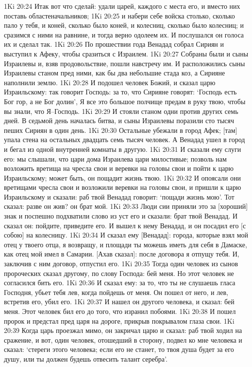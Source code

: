 1Ki 20:24  Итак вот что сделай: удали царей, каждого с места его, и вместо них поставь областеначальников;
1Ki 20:25  и набери себе войска столько, сколько пало у тебя, и коней, сколько было коней, и колесниц, сколько было колесниц; и сразимся с ними на равнине, и тогда верно одолеем их. И послушался он голоса их и сделал так.
1Ki 20:26  По прошествии года Венадад собрал Сириян и выступил к Афеку, чтобы сразиться с Израилем.
1Ki 20:27  Собраны были и сыны Израилевы и, взяв продовольствие, пошли навстречу им. И расположились сыны Израилевы станом пред ними, как бы два небольшие стада коз, а Сирияне наполнили землю.
1Ki 20:28  И подошел человек Божий, и сказал царю Израильскому: так говорит Господь: за то, что Сирияне говорят: `Господь есть Бог гор, а не Бог долин', Я все это большое полчище предам в руку твою, чтобы вы знали, что Я--Господь.
1Ki 20:29  И стояли станом одни против других семь дней. В седьмой день началась битва, и сыны Израилевы поразили сто тысяч пеших Сириян в один день.
1Ki 20:30  Остальные убежали в город Афек; [там] упала стена на остальных двадцать семь тысяч человек. А Венадад ушел в город и бегал из одной внутренней комнаты в другую.
1Ki 20:31  И сказали ему слуги его: мы слышали, что цари дома Израилева цари милостивые; позволь нам возложить вретища на чресла свои и веревки на головы свои и пойти к царю Израильскому; может быть, он пощадит жизнь твою.
1Ki 20:32  И опоясали они вретищами чресла свои и возложили веревки на головы свои, и пришли к царю Израильскому и сказали: раб твой Венадад говорит: `пощади жизнь мою'. Тот сказал: разве он жив? он брат мой.
1Ki 20:33  Люди сии приняли это за [хороший] знак и поспешно подхватили слово из уст его и сказали: брат твой Венадад. И сказал он: пойдите, приведите его. И вышел к нему Венадад, и он посадил его [с собою] на колесницу.
1Ki 20:34  И сказал ему [Венадад]: города, которые взял мой отец у твоего отца, я возвращу, и площади ты можешь иметь для себя в Дамаске, как отец мой имел в Самарии. [Ахав сказал]: после договора я отпущу тебя. И, заключив с ним договор, отпустил его.
1Ki 20:35  Тогда один человек из сынов пророческих сказал другому, по слову Господа: бей меня. Но этот человек не согласился бить его.
1Ki 20:36  И сказал ему: за то, что ты не слушаешь гласа Господня, убьет тебя лев, когда пойдешь от меня. Он пошел от него, и лев, встретив его, убил его.
1Ki 20:37  И нашел он другого человека, и сказал: бей меня. Этот человек бил его до того, что изранил побоями.
1Ki 20:38  И пошел пророк и предстал пред царя на дороге, прикрыв покрывалом глаза свои.
1Ki 20:39  Когда царь проезжал мимо, он закричал царю и сказал: раб твой ходил на сражение, и вот, один человек, отошедший в сторону, подвел ко мне человека и сказал: `стереги этого человека; если его не станет, то твоя душа будет за его душу, или ты должен будешь отвесить талант серебра'.
